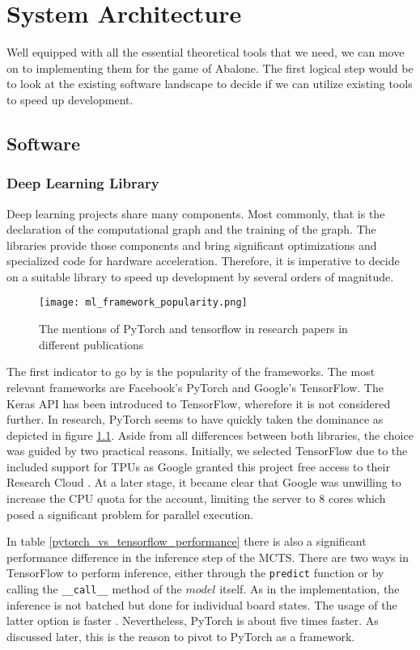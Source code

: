 \chapter{System Architecture}
\label{system-architecture}
Well equipped with all the essential theoretical tools that we need, we can move on to implementing them for the game of Abalone. The first logical step would be to look at the existing software landscape to decide if we can utilize existing tools to speed up development.

\section{Software}
\subsection{Deep Learning Library}
Deep learning projects share many components. Most commonly, that is the declaration of the computational graph and the training of the graph. The libraries provide those components and bring significant optimizations and specialized code for hardware acceleration. Therefore, it is imperative to decide on a suitable library to speed up development by several orders of magnitude.

\begin{figure}
    \centering
    \texttt{[image: ml\_framework\_popularity.png]}
    \caption{The mentions of PyTorch and tensorflow in research papers in different publications \cite{noauthor_state_2019}}
    \label{ml_framework_popularity}
\end{figure}

The first indicator to go by is the popularity of the frameworks. The most relevant frameworks are Facebook's PyTorch and Google's TensorFlow. The Keras API has been introduced to TensorFlow, wherefore it is not considered further. In research, PyTorch seems to have quickly taken the dominance as depicted in figure \ref{ml_framework_popularity}. Aside from all differences between both libraries, the choice was guided by two practical reasons. Initially, we selected TensorFlow due to the included support for TPUs as Google granted this project free access to their Research Cloud \cite{noauthor_tpu_nodate}. At a later stage, it became clear that Google was unwilling to increase the CPU quota for the account, limiting the server to 8 cores which posed a significant problem for parallel execution.

In table \ref{pytorch_vs_tensorflow_performance} there is also a significant performance difference in the inference step of the MCTS. There are two ways in TensorFlow to perform inference, either through the \texttt{predict} function or by calling the \texttt{\_\_call\_\_} method of the $model$ itself. As in the implementation, the inference is not batched but done for individual board states. The usage of the latter option is faster \cite{noauthor_tfkerasmodel_nodate}. Nevertheless, PyTorch is about five times faster. As discussed later, this is the reason to pivot to PyTorch as a framework.

